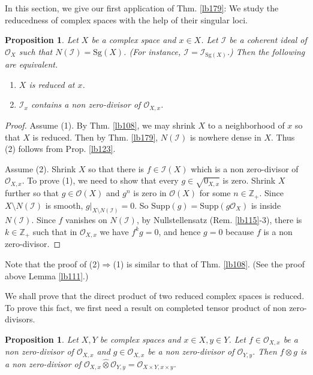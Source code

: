 \documentclass[12pt,b5paper,notitlepage]{report}
\theoremstyle{definition}
\theoremstyle{plain}
\newtheorem{pp}[df]{Proposition}
\newcommand{\mc}{\mathcal}
\newcommand{\wht}{\widehat}
\newcommand{\scr}{\mathscr}
\newcommand{\Zbb}{\mathbb Z}
\newcommand{\Supp}{\mathrm{Supp}}
\newcommand{\Sg}{\mathrm{Sg}}
\numberwithin{equation}{section}
\begin{document}
In this section, we give our first application of Thm. \ref{lb179}: We study the reducedness of complex spaces with the help of their singular loci.
\begin{pp}\label{lb181}
Let $X$ be a complex space and $x\in X$. Let $\mc I$ be a coherent ideal of $\scr O_X$ such that $N(\mc I)=\Sg(X)$. (For instance, $\mc I=\scr I_{\Sg(X)}$.) Then the following are equivalent.
\begin{enumerate}[label=(\arabic*)]
\item $X$ is reduced at $x$.
\item $\mc I_x$ contains a non zero-divisor of $\scr O_{X,x}$.
\end{enumerate}
\end{pp}

\begin{proof}
Assume (1). By Thm. \ref{lb108}, we may shrink $X$ to a neighborhood of $x$ so that $X$ is reduced. Then by Thm. \ref{lb179}, $N(\mc I)$ is nowhere dense in $X$. Thus (2) follows from Prop. \ref{lb123}.

Assume (2). Shrink $X$ so that there is $f\in\mc I(X)$ which is a non zero-divisor of $\scr O_{X,x}$. To prove (1), we need to show that every $g\in\sqrt{0_{X,x}}$ is zero. Shrink $X$ further so that $g\in\scr O(X)$ and $g^n$ is zero in $\scr O(X)$ for some $n\in\Zbb_+$. Since $X\setminus N(\mc I)$ is smooth, $g|_{X\setminus N(\mc I)}=0$. So $\Supp(g)=\Supp(g\scr O_X)$ is inside $N(\mc I)$. Since $f$ vanishes on $N(\mc I)$, by Nullstellensatz (Rem. \ref{lb115}-3), there is $k\in\Zbb_+$ such that in $\scr O_{X,x}$ we have $f^kg=0$, and hence $g=0$ because $f$ is a non zero-divisor. 
\end{proof}

Note that the proof of (2)$\Rightarrow$(1) is similar to that of Thm. \ref{lb108}. (See the proof above Lemma \ref{lb111}.)


We shall prove that the direct product of two reduced complex spaces is reduced. To prove this fact, we first need a result on completed tensor product of non zero-divisors.

\begin{pp}\label{lb180}
Let $X,Y$ be complex spaces and $x\in X,y\in Y$. Let $f\in\scr O_{X,x}$ be a non zero-divisor of $\scr O_{X,x}$ and $g\in\scr O_{X,x}$ be a non zero-divisor of $\scr O_{Y,y}$. Then $f\otimes g$ is a non zero-divisor of $\scr O_{X,x}\wht\otimes\scr O_{Y,y}=\scr O_{X\times Y,x\times y}$.
\end{pp}
\end{document}
